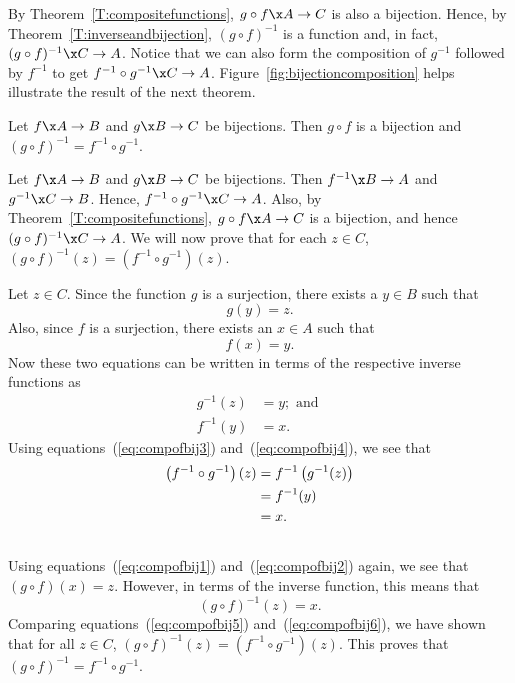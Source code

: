 %
By Theorem~\ref{T:compositefunctions},  $g \circ f\x A \to C$  is also a bijection. Hence, by Theorem~\ref{T:inverseandbijection},  
$( {g \circ f} )^{ - 1} $ is a function and, in fact, 
$( {g \circ f} )^{ - 1} \x C \to A$.  Notice that we can also form the composition of  $g^{ - 1} $  followed by  $f^{ - 1} $ to get  $f^{ - 1}  \circ g^{ - 1} \x C \to A$.  Figure~\ref {fig:bijectioncomposition} helps illustrate the result of the next theorem.
%
\setcounter{equation}{0}
\begin{theorem} \label{compositionofbijections}
Let $f\x A \to B$  and  $g\x B \to C$  be bijections.  Then  $g \circ f$  is a bijection and  
$( {g \circ f} )^{ - 1}  = f^{ - 1}  \circ g^{ - 1} $.
\end{theorem}
%
\begin{myproof}
Let $f\x A \to B$  and  $g\x B \to C$  be bijections.  Then  $f^{ - 1} \x B \to A$  and  
$g^{ - 1} \x C \to B$.  Hence, $f^{ - 1}  \circ g^{ - 1} \x C \to A$.  Also, by Theorem~\ref{T:compositefunctions},  $g \circ f\x A \to C$  is a bijection, and hence 
$( {g \circ f} )^{ - 1} \x C \to A$.   We will now prove that for each  
$z \in C$, 
$( {g \circ f} )^{ - 1} ( z ) = ( {f^{ - 1}  \circ g^{ - 1} } )( z )$.

Let  $z \in C$.  Since the function  $g$  is a surjection, there exists a  $y \in B$ such that
\begin{equation} \label{eq:compofbij1} 
g( y ) = z.
\end{equation}
%
Also, since  $f$  is a surjection, there exists an  $x \in A$  such that
\begin{equation} \label{eq:compofbij2}
f( x ) = y.
\end{equation}
%
Now these two equations can be written in terms of the  respective inverse functions as
\begin{align}
g^{ - 1} ( z ) &= y; \text{ and }  \label{eq:compofbij3}\\
f^{ - 1} ( y ) &= x.  \label{eq:compofbij4}
\end{align}
%
Using equations~(\ref{eq:compofbij3}) and~(\ref{eq:compofbij4}), we see that
\begin{align}  \notag
  \left( {f^{ - 1}  \circ g^{ - 1} } \right)( z ) &= f^{ - 1} \left( {g^{ - 1} ( z )} \right) \\ \notag
                                                  &= f^{ - 1} ( y ) \\ \label{eq:compofbij5}                                                  &= x. \\  \notag
\end{align} 
%
Using equations~(\ref{eq:compofbij1}) and~(\ref{eq:compofbij2})  again, we see that  
$( {g \circ f} )( x ) = z$.  However, in terms of the inverse function, this means that
\begin{equation} \label{eq:compofbij6}
( {g \circ f} )^{ - 1} ( z ) = x.
\end{equation}
%
Comparing equations~(\ref{eq:compofbij5}) and~(\ref{eq:compofbij6}), we have shown that for all  $z \in C$,
\linebreak 
$( {g \circ f} )^{ - 1} ( z ) = ( {f^{ - 1}  \circ g^{ - 1} } )( z )$.  This proves that  
$( {g \circ f} )^{ - 1}  = f^{ - 1}  \circ g^{ - 1} $.
\end{myproof}
\hbreak

\endinput
